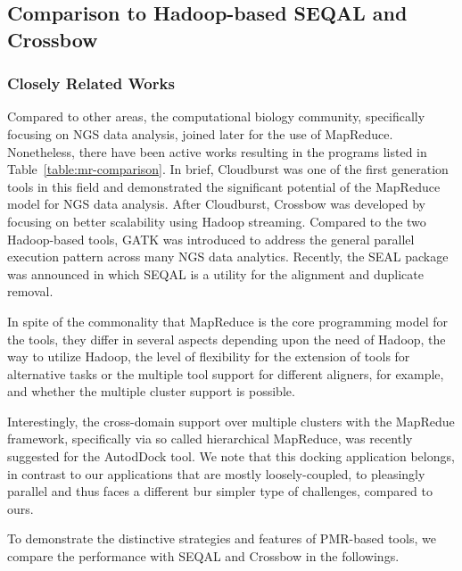 \documentclass{sig-alternate}
\begin{document}
{\subsection{Comparison to Hadoop-based SEQAL and Crossbow}
\subsubsection{Closely Related Works}
Compared to other areas, the computational biology community, specifically focusing on NGS data analysis, joined later for the use of MapReduce\cite{cloudburst}.  Nonetheless, there have been active works resulting in the programs listed in Table~\ref{table:mr-comparison}.  In brief, Cloudburst was one of the first generation tools in this field and  demonstrated the significant potential of the MapReduce model for NGS data analysis.  After Cloudburst, Crossbow was developed by focusing on better scalability using Hadoop streaming.  Compared to the two Hadoop-based tools, GATK was introduced to address the general parallel execution pattern across many NGS data analytics.  Recently, the SEAL package was announced in which SEQAL is a utility for the alignment and duplicate removal.   

In spite of the commonality that MapReduce is the core programming model for the tools, they differ in several aspects depending upon the need of Hadoop, the way to utilize Hadoop, the level of flexibility for the extension of tools for alternative tasks or the multiple tool support for different aligners, for example, and whether the multiple cluster support is possible.

Interestingly, the cross-domain support over multiple clusters with the MapRedue framework, specifically via so called hierarchical MapReduce, was recently suggested for the AutodDock tool.  We note that this docking application belongs, in contrast to our applications that are mostly loosely-coupled, to pleasingly parallel and thus faces a different bur simpler type of challenges, compared to ours\cite{ecmls11-mr-autodock}.

To demonstrate the distinctive strategies and features of PMR-based tools, we compare the performance with SEQAL and Crossbow in the followings.  

}
\end{document}

